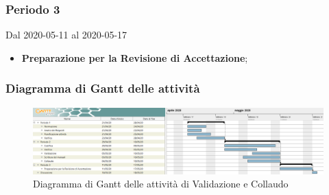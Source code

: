 \subsubsection{Periodo 3} 
Dal 2020-05-11 al 2020-05-17
\begin{itemize}
	\item \textbf{Preparazione per la Revisione di Accettazione};
\end{itemize}
\subsubsection{Diagramma di Gantt delle attività}
\begin{figure}[h]
	\includegraphics[scale=1.1]{sezioni/DiagrammiGantt/Validazione.png}
	\caption{Diagramma di Gantt delle attività di Validazione e Collaudo}
\end{figure}
